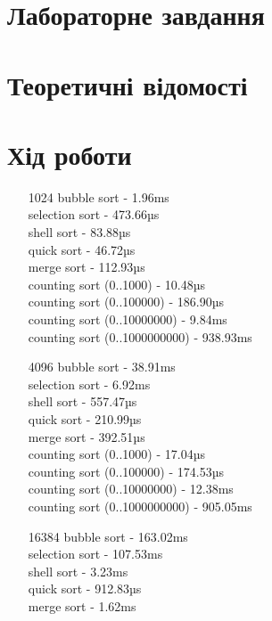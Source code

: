 \documentclass{article}
\begin{document}
\begin{normalsize}
		\section*{Лабораторне завдання}

		\begin{center}

		\end{center}
		
		\section*{Теоретичні відомості}
		
		\section*{Хід роботи}
		\begin{enumerate}
			\item [1024] bubble sort - 1.96ms\\
			selection sort - 473.66µs\\
			shell sort - 83.88µs\\
			quick sort - 46.72µs\\
			merge sort - 112.93µs\\
			counting sort (0..1000) - 10.48µs \\
			counting sort (0..100000) - 186.90µs\\
			counting sort (0..10000000) - 9.84ms \\
			counting sort (0..1000000000) - 938.93ms
			\item [4096] bubble sort - 38.91ms\\
			selection sort - 6.92ms\\
			shell sort - 557.47µs\\
			quick sort - 210.99µs\\
			merge sort - 392.51µs\\
			counting sort (0..1000) - 17.04µs\\
			counting sort (0..100000) - 174.53µs\\
			counting sort (0..10000000) - 12.38ms\\
			counting sort (0..1000000000) - 905.05ms
			\item [16384] bubble sort - 163.02ms\\
			selection sort - 107.53ms\\
			shell sort - 3.23ms\\
			quick sort - 912.83µs\\
			merge sort - 1.62ms\\

\end{enumerate}
\end{normalsize}
\end{document}
